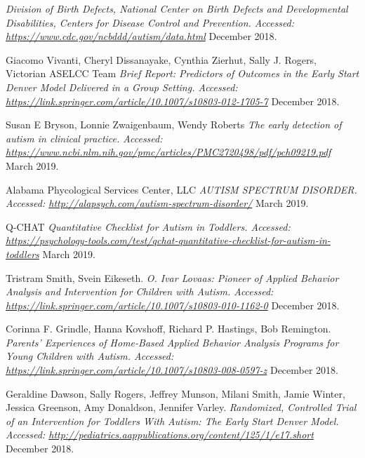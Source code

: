 \let\cleardoublepage\clearpage
\cleardoublepage
{}


\begin{thebibliography}{1}
\vspace*{15pt}


 {\em Division of Birth Defects, National Center on Birth Defects and Developmental Disabilities, Centers for Disease Control and Prevention. Accessed: \url{https://www.cdc.gov/ncbddd/autism/data.html}} December 2018.

 Giacomo Vivanti, Cheryl Dissanayake, Cynthia Zierhut, Sally J. Rogers, Victorian ASELCC Team {\em Brief Report: Predictors of Outcomes in the Early Start Denver Model Delivered in a Group Setting. Accessed:  \url{https://link.springer.com/article/10.1007/s10803-012-1705-7}} December 2018.

 Susan E Bryson, Lonnie Zwaigenbaum, Wendy Roberts {\em The early detection of autism in clinical practice. Accessed:  \url{https://www.ncbi.nlm.nih.gov/pmc/articles/PMC2720498/pdf/pch09219.pdf}} March 2019.

 Alabama Phycological Services Center, LLC {\em AUTISM SPECTRUM DISORDER. Accessed:  \url{http://alapsych.com/autism-spectrum-disorder/}} March 2019.

 Q-CHAT {\em Quantitative Checklist for Autism in Toddlers. Accessed:  \url{https://psychology-tools.com/test/qchat-quantitative-checklist-for-autism-in-toddlers}} March 2019.

 Tristram Smith, Svein Eikeseth. {\em O. Ivar Lovaas: Pioneer of Applied Behavior Analysis and Intervention for Children with Autism. Accessed: \url{https://link.springer.com/article/10.1007/s10803-010-1162-0}} December 2018.

 Corinna F. Grindle, Hanna Kovshoff, Richard P. Hastings, Bob Remington. {\em Parents’ Experiences of Home-Based Applied Behavior Analysis Programs for Young Children with Autism. Accessed: \url{https://link.springer.com/article/10.1007/s10803-008-0597-z}} December 2018.

 Geraldine Dawson, Sally Rogers, Jeffrey Munson, Milani Smith, Jamie Winter, Jessica Greenson, Amy Donaldson, Jennifer Varley. {\em Randomized, Controlled Trial of an Intervention for Toddlers With Autism: The Early Start Denver Model. Accessed: \url{http://pediatrics.aappublications.org/content/125/1/e17.short}} December 2018.


\end{thebibliography}
